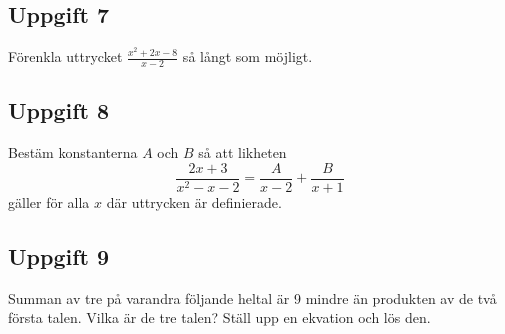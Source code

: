 \documentclass[12pt]{article}
\begin{document}
\subsection*{Uppgift 7}
Förenkla uttrycket $\frac{x^2 + 2x - 8}{x - 2}$ så långt som möjligt.

\subsection*{Uppgift 8}
Bestäm konstanterna $A$ och $B$ så att likheten
\[
\frac{2x+3}{x^2-x-2} = \frac{A}{x-2} + \frac{B}{x+1}
\]
gäller för alla $x$ där uttrycken är definierade.

\subsection*{Uppgift 9}
Summan av tre på varandra följande heltal är 9 mindre än produkten av de två första talen. Vilka är de tre talen? Ställ upp en ekvation och lös den.
\end{document}
